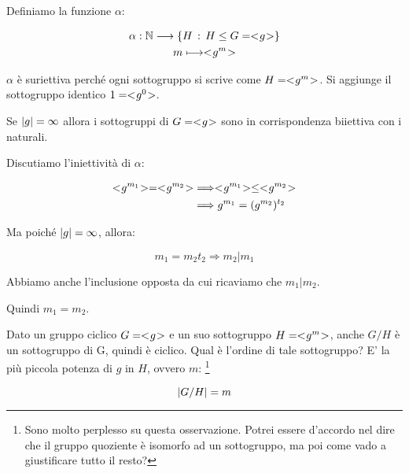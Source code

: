 Definiamo la funzione $\alpha$:

\begin{gather}
	\alpha: \mathbb{N} \longrightarrow \{H \,:\, H \le G = < \negmedspace g \negmedspace >\} \\
	m \longmapsto < \negmedspace g^m \negmedspace >
\end{gather}

$\alpha$ è suriettiva perché ogni sottogruppo si scrive come $H = < \negmedspace g^m \negmedspace >$. Si aggiunge il sottogruppo identico $1 = < \negmedspace g^0 \negmedspace >$.

\begin{teorema}
	Se $\lvert g \rvert = \infty$ allora i sottogruppi di $G = < \negmedspace g \negmedspace >$ sono in corrispondenza biiettiva con i naturali.
\end{teorema}
\begin{dimostrazione}
	Discutiamo l'iniettività di $\alpha$:
	
	\begin{align}
		\gen{g^{m_1}} = \gen{g^{m_2}} &\Longrightarrow \gen{g^{m_1}} \le \gen{g^{m_2}} \\
		&\Longrightarrow g^{m_1} = (g^{m_2})^{t_2}
	\end{align}

	Ma poiché $\lvert g \rvert = \infty$, allora:
	
	\begin{equation}
		m_1 = m_2 t_2 \Longrightarrow m_2 | m_1
	\end{equation}

	Abbiamo anche l'inclusione opposta da cui ricaviamo che $m_1 | m_2$.
	
	Quindi $m_1 = m_2$.
\end{dimostrazione}

Dato un gruppo ciclico $G = < \negmedspace g \negmedspace >$ e un suo sottogruppo $H = < \negmedspace g^m \negmedspace >$, anche $G/H$ è un sottogruppo di G, quindi è ciclico. Qual è l'ordine di tale sottogruppo? E' la più piccola potenza di $g$ in $H$, ovvero $m$:
\footnote{Sono molto perplesso su questa osservazione. Potrei essere d'accordo nel dire che il gruppo quoziente è isomorfo ad un sottogruppo, ma poi come vado a giustificare tutto il resto?}

\begin{equation}
	\lvert G/H \rvert = m
\end{equation}

